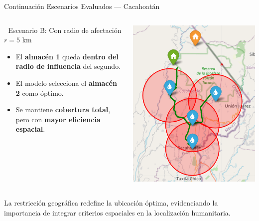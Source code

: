 \documentclass[
  ignorenonframetext,
]{beamer}
\providecommand{\tightlist}{%
  \setlength{\itemsep}{0pt}\setlength{\parskip}{0pt}}
\begin{document}
\begin{frame}{Continuación Escenarios Evaluados --- Cacahoatán}
\label{continuaciuxf3n-escenarios-evaluados-cacahoatuxe1n}
\begin{columns}[T]
\begin{column}{0.5\linewidth}
🔹 Escenario B: Con radio de afectación \(r = 5\) km

\begin{itemize}
\tightlist
\item
  El \textbf{almacén 1} queda \textbf{dentro del radio de influencia}
  del segundo.\\
\item
  El modelo selecciona el \textbf{almacén 2} como óptimo.\\
\item
  Se mantiene \textbf{cobertura total}, pero con \textbf{mayor
  eficiencia espacial}.
\end{itemize}
\end{column}

\begin{column}{0.5\linewidth}
\includegraphics[width=0.7\linewidth,height=\textheight,keepaspectratio]{radio.png}
\end{column}
\end{columns}

La restricción geográfica redefine la ubicación óptima, evidenciando la
importancia de integrar criterios espaciales en la localización
humanitaria.
\end{frame}
\end{document}

